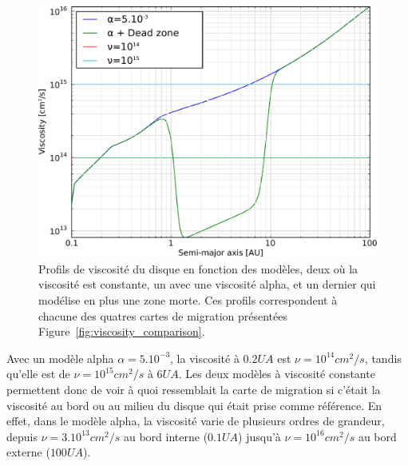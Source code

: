 \begin{figure}[htb]
\centering
\includegraphics[width=0.6\linewidth]{figure/migration_map/viscosity_profile.pdf}
\caption{Profils de viscosité du disque en fonction des modèles, deux où la viscosité est constante, un avec une viscosité alpha, et un dernier qui modélise en plus une zone morte. Ces profils correspondent à chacune des quatres cartes de migration présentées Figure~\ref{fig:viscosity_comparison}.}\label{fig:viscosity_profiles}
\end{figure}

Avec un modèle alpha $\alpha=5.10^{-3}$, la viscosité à $0.2\unit{UA}$ est $\nu=10^{14}\unit{cm^2/s}$, tandis qu'elle est de $\nu=10^{15}\unit{cm^2/s}$ à $6\unit{UA}$. Les deux modèles à viscosité constante permettent donc de voir à quoi ressemblait la carte de migration si c'était la viscosité au bord ou au milieu du disque qui était prise comme référence. En effet, dans le modèle alpha, la viscosité varie de plusieurs ordres de grandeur, depuis $\nu=3.10^{13}\unit{cm^2/s}$ au bord interne ($0.1\unit{UA}$) jusqu'à $\nu=10^{16}\unit{cm^2/s}$ au bord externe ($100\unit{UA}$).

